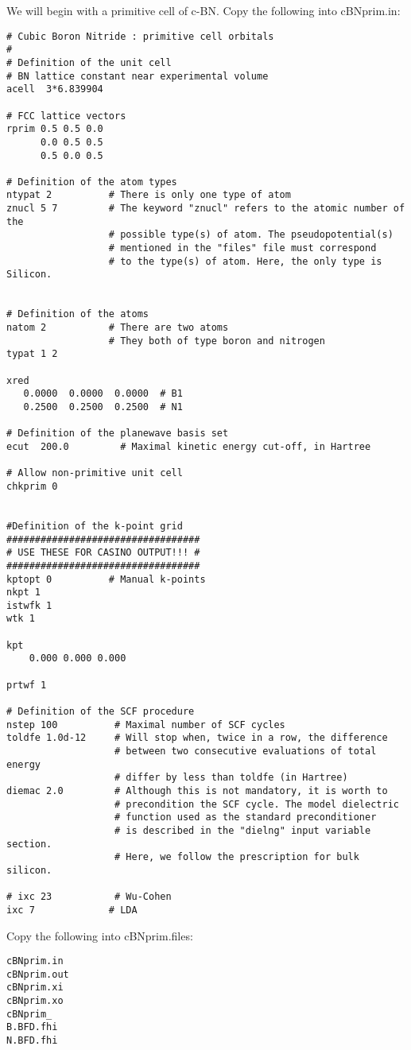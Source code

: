 We will begin with a primitive cell of c-BN. Copy the following into cBNprim.in:
\begin{verbatim}
# Cubic Boron Nitride : primitive cell orbitals
#
# Definition of the unit cell
# BN lattice constant near experimental volume
acell  3*6.839904

# FCC lattice vectors
rprim 0.5 0.5 0.0
      0.0 0.5 0.5
      0.5 0.0 0.5

# Definition of the atom types
ntypat 2          # There is only one type of atom
znucl 5 7         # The keyword "znucl" refers to the atomic number of the 
                  # possible type(s) of atom. The pseudopotential(s) 
                  # mentioned in the "files" file must correspond
                  # to the type(s) of atom. Here, the only type is Silicon.
                         

# Definition of the atoms
natom 2           # There are two atoms
                  # They both of type boron and nitrogen
typat 1 2

xred
   0.0000  0.0000  0.0000  # B1
   0.2500  0.2500  0.2500  # N1

# Definition of the planewave basis set
ecut  200.0         # Maximal kinetic energy cut-off, in Hartree

# Allow non-primitive unit cell
chkprim 0


#Definition of the k-point grid
##################################
# USE THESE FOR CASINO OUTPUT!!! #
##################################
kptopt 0          # Manual k-points
nkpt 1
istwfk 1
wtk 1

kpt
    0.000 0.000 0.000

prtwf 1

# Definition of the SCF procedure
nstep 100          # Maximal number of SCF cycles
toldfe 1.0d-12     # Will stop when, twice in a row, the difference 
                   # between two consecutive evaluations of total energy 
                   # differ by less than toldfe (in Hartree) 
diemac 2.0         # Although this is not mandatory, it is worth to
                   # precondition the SCF cycle. The model dielectric
                   # function used as the standard preconditioner
                   # is described in the "dielng" input variable section.
                   # Here, we follow the prescription for bulk silicon.

# ixc 23           # Wu-Cohen
ixc 7             # LDA
\end{verbatim}

Copy the following into cBNprim.files:
\begin{verbatim}
cBNprim.in
cBNprim.out
cBNprim.xi
cBNprim.xo
cBNprim_
B.BFD.fhi
N.BFD.fhi
\end{verbatim}

